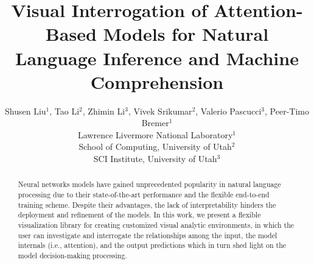 \documentclass[11pt,a4paper]{article}
\title{Visual Interrogation of Attention-Based Models for Natural Language Inference and Machine Comprehension}
\author{Shusen Liu$^{1}$, Tao Li$^{2}$,  Zhimin Li$^{3}$,  Vivek Srikumar$^{2}$, Valerio Pascucci$^{3}$, Peer-Timo Bremer$^{1}$ \\
  Lawrence Livermore National Laboratory$^{1}$\\
  School of Computing, University of Utah$^{2}$\\  
  SCI Institute, University of Utah$^{3}$\\
}
\begin{document}
\maketitle


\begin{abstract}
Neural networks models have gained unprecedented popularity in natural language processing due to their state-of-the-art performance and the flexible end-to-end training scheme. Despite their advantages, the lack of interpretability hinders the deployment and refinement of the models.
%
In this work, we present a flexible visualization library for creating customized visual analytic environments, in which the user can investigate and interrogate the relationships among the input, the model internals (i.e., attention), and the output predictions which in turn shed light on the model decision-making processing.
 
\end{abstract}










\end{document}
